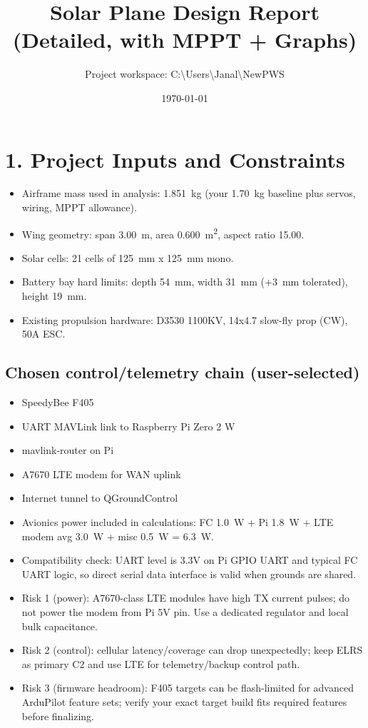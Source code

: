 \documentclass[11pt]{article}
\title{Solar Plane Design Report (Detailed, with MPPT + Graphs)}
\author{Project workspace: C:\textbackslash Users\textbackslash Janal\textbackslash NewPWS}
\date{\today}
\begin{document}
\maketitle

\section*{1. Project Inputs and Constraints}
\begin{itemize}
  \item Airframe mass used in analysis: \SI{1.851}{kg} (your \SI{1.70}{kg} baseline plus servos, wiring, MPPT allowance).
  \item Wing geometry: span \SI{3.00}{m}, area \SI{0.600}{m^2}, aspect ratio 15.00.
  \item Solar cells: 21 cells of \SI{125}{mm} x \SI{125}{mm} mono.
  \item Battery bay hard limits: depth \SI{54}{mm}, width \SI{31}{mm} (+\SI{3}{mm} tolerated), height \SI{19}{mm}.
  \item Existing propulsion hardware: D3530 1100KV, 14x4.7 slow-fly prop (CW), 50A ESC.
\end{itemize}
\subsection*{Chosen control/telemetry chain (user-selected)}
\begin{itemize}
  \item SpeedyBee F405
  \item UART MAVLink link to Raspberry Pi Zero 2 W
  \item mavlink-router on Pi
  \item A7670 LTE modem for WAN uplink
  \item Internet tunnel to QGroundControl
\end{itemize}
\begin{itemize}
  \item Avionics power included in calculations: FC \SI{1.0}{W} + Pi \SI{1.8}{W} + LTE modem avg \SI{3.0}{W} + misc \SI{0.5}{W} = \SI{6.3}{W}.
  \item Compatibility check: UART level is 3.3V on Pi GPIO UART and typical FC UART logic, so direct serial data interface is valid when grounds are shared.
  \item Risk 1 (power): A7670-class LTE modules have high TX current pulses; do not power the modem from Pi 5V pin. Use a dedicated regulator and local bulk capacitance.
  \item Risk 2 (control): cellular latency/coverage can drop unexpectedly; keep ELRS as primary C2 and use LTE for telemetry/backup control path.
  \item Risk 3 (firmware headroom): F405 targets can be flash-limited for advanced ArduPilot feature sets; verify your exact target build fits required features before finalizing.
\end{itemize}
\end{document}
